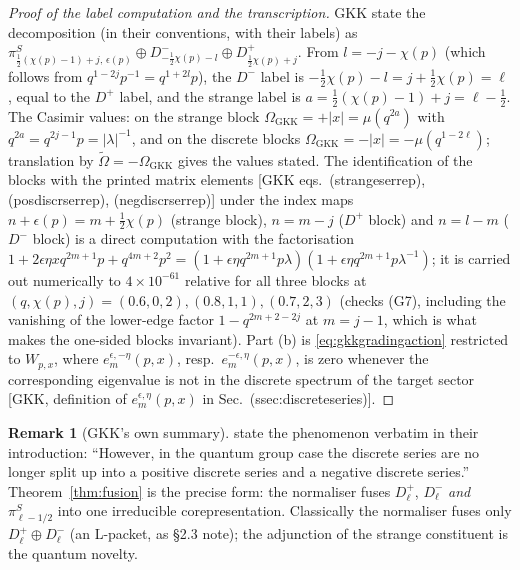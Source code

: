 \documentclass[11pt,a4paper]{article}
\theoremstyle{definition}
\newtheorem{remark}[definition]{Remark}
\theoremstyle{plain}
\newcommand{\tCas}{\tilde\Omega}                %
\begin{document}
\begin{proof}[Proof of the label computation and the transcription]
GKK state the decomposition (in their conventions, with their labels) as
$\pi^{S}_{\frac12(\chi(p)-1)+j,\,\epsilon(p)}\oplus D^{-}_{-\frac12\chi(p)-l}\oplus
D^{+}_{\frac12\chi(p)+j}$. From $l=-j-\chi(p)$ (which follows from
$q^{1-2j}p^{-1}=q^{1+2l}p$), the $D^{-}$ label is
$-\tfrac12\chi(p)-l=j+\tfrac12\chi(p)=\ell$, equal to the $D^{+}$ label, and the strange
label is $a=\tfrac12(\chi(p)-1)+j=\ell-\tfrac12$. The Casimir values: on the strange block
$\Omega_{\mathrm{GKK}}=+|x|=\mu(q^{2a})$ with $q^{2a}=q^{2j-1}p=|\lambda|^{-1}$, and on the
discrete blocks $\Omega_{\mathrm{GKK}}=-|x|=-\mu(q^{1-2\ell})$; translation by
$\tCas=-\Omega_{\mathrm{GKK}}$ gives the values stated. The identification of the blocks
with the printed matrix elements [GKK eqs.\ (strangeserrep), (posdiscrserrep),
(negdiscrserrep)] under the index maps $n+\epsilon(p)=m+\tfrac12\chi(p)$ (strange block),
$n=m-j$ ($D^{+}$ block) and $n=l-m$ ($D^{-}$ block) is a direct computation with the
factorisation $1+2\epsilon\eta xq^{2m+1}p+q^{4m+2}p^{2}
=(1+\epsilon\eta q^{2m+1}p\lambda)(1+\epsilon\eta q^{2m+1}p\lambda^{-1})$; it is carried
out numerically to $4\times10^{-61}$ relative for all three blocks at
$(q,\chi(p),j)=(0.6,0,2),(0.8,1,1),(0.7,2,3)$ (checks (G7), including the vanishing of the
lower-edge factor $1-q^{2m+2-2j}$ at $m=j-1$, which is what makes the one-sided blocks
invariant). Part (b) is \eqref{eq:gkkgradingaction} restricted to $W_{p,x}$, where
$e^{\epsilon,-\eta}_{m}(p,x)$, resp.\ $e^{-\epsilon,\eta}_{m}(p,x)$, is zero whenever the
corresponding eigenvalue is not in the discrete spectrum of the target sector [GKK,
definition of $e^{\epsilon,\eta}_{m}(p,x)$ in Sec.\ (ssec:discreteseries)].
\end{proof}

\begin{remark}[GKK's own summary]\label{rem:gkkquote}
\cite{Groenevelt:2009gkk} state the phenomenon verbatim in their introduction: ``However, in
the quantum group case the discrete series are no longer split up into a positive discrete
series and a negative discrete series.'' Theorem~\ref{thm:fusion} is the precise form: the
normaliser fuses $D^{+}_{\ell}$, $D^{-}_{\ell}$ \emph{and} $\pi^{S}_{\ell-1/2}$ into one
irreducible corepresentation. Classically the normaliser fuses only $D^{+}_{\ell}\oplus
D^{-}_{\ell}$ (an L-packet, as \cite{Schouten:2025dssyk} \S2.3 note); the adjunction of the
strange constituent is the quantum novelty.
\end{remark}
\end{document}
